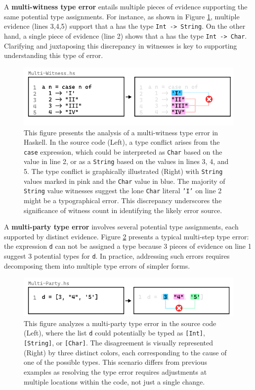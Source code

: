 A \textbf{multi-witness type error} entails multiple pieces of evidence supporting the same potential type assignments. For instance, as shown in Figure \ref{fig:multi-witness-example}, multiple evidence (lines 3,4,5) support that a has the type \texttt{Int -> String}. On the other hand, a single piece of evidence (line 2) shows that a has the type \texttt{Int -> Char}.  Clarifying and juxtaposing this discrepancy in witnesses is key to supporting understanding this type of error.

\begin{figure}[hbt]
  \includegraphics[width=\linewidth]{Multi-Witness}
  \caption{
    \label{fig:multi-witness-example}
    This figure presents the analysis of a multi-witness type error in Haskell. In the source code (Left), a type conflict arises from the \texttt{case} expression, which could be interpreted as \texttt{Char} based on the value in line 2, or as a \texttt{String} based on the values in lines 3, 4, and 5. The type conflict is graphically illustrated (Right) with \texttt{String} values marked in pink and the \texttt{Char} value in blue. The majority of \texttt{String} value witnesses suggest the lone \texttt{Char} literal \texttt{'I'} on line 2 might be a typographical error. This discrepancy underscores the significance of witness count in identifying the likely error source.}
\end{figure}

A \textbf{multi-party type error} involves several potential type assignments, each supported by distinct evidence.  Figure \ref{fig:multi-party-example} presents a typical multi-step type error: the expression \texttt{d} can not be assigned a type because 3 pieces of evidence on line 1 suggest 3 potential types for \texttt{d}. In practice, addressing such errors requires decomposing them into multiple type errors of simpler forms.


\begin{figure}[hbt]
  \includegraphics[width=\linewidth]{Multi-Party}
  \caption{
    \label{fig:multi-party-example}
    This figure analyzes a multi-party type error in the source code (Left), where the list \texttt{d} could potentially be typed as \texttt{[Int]}, \texttt{[String]}, or \texttt{[Char]}. The disagreement is visually represented (Right) by three distinct colors, each corresponding to the cause of one of the possible types. This scenario differs from previous examples as resolving the type error requires adjustments at multiple locations within the code, not just a single change.
       }
\end{figure}

